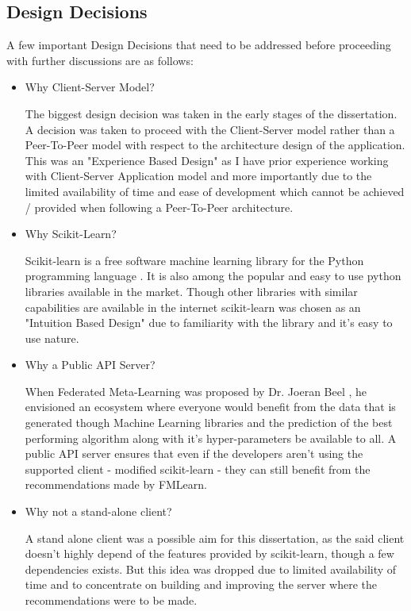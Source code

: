 \subsection{Design Decisions}
\label{design-decisioins}
A few important Design Decisions that need to be addressed before proceeding with further discussions are as follows:
\begin{itemize}
    \item Why Client-Server Model?
    
    The biggest design decision was taken in the early stages of the dissertation. A decision was taken to proceed with the Client-Server model rather than a Peer-To-Peer model with respect to the architecture design of the application. This was an "Experience Based Design" as I have prior experience working with Client-Server Application model and more importantly due to the limited availability of time and ease of development which cannot be achieved / provided when following a Peer-To-Peer architecture.

    \item Why Scikit-Learn?
    
    Scikit-learn is a free software machine learning library for the Python programming language \citep{scikit-learn}. It is also among the popular and easy to use python libraries available in the market. Though other libraries with similar capabilities are available in the internet scikit-learn was chosen as an "Intuition Based Design" due to familiarity with the library and it's easy to use nature.
    
    \item Why a Public API Server?
    
    When Federated Meta-Learning was proposed by Dr. Joeran Beel \citep{fml}, he envisioned an ecosystem where everyone would benefit from the data that is generated though Machine Learning libraries and the prediction of the best performing algorithm along with it's hyper-parameters be available to all. A public API server ensures that even if the developers aren't using the supported client - modified scikit-learn - they can still benefit from the recommendations made by FMLearn.
    
    \item Why not a stand-alone client?
    
    A stand alone client was a possible aim for this dissertation, as the said client doesn't highly depend of the features provided by scikit-learn, though a few dependencies exists. But this idea was dropped due to limited availability of time and to concentrate on building and improving the server where the recommendations were to be made.
    

\end{itemize}
